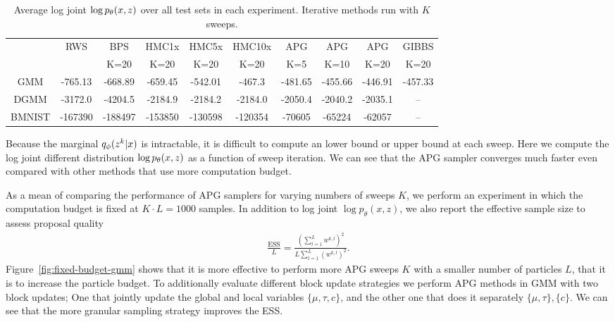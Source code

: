 \documentclass{article}
\theoremstyle{definition}
\begin{document}
\begin{table}[t!]
\centering
\caption{Average log joint $\log p_\theta (x, z)$ over all test sets in each experiment. Iterative methods run with $K$ sweeps. }
\begin{tabular}{cccccccccc}
\toprule
     & RWS & BPS & HMC1x & HMC5x & HMC10x & APG & APG & APG & GIBBS \\
     & & K=20 & K=20 & K=20 & K=20 &  K=5 & K=10 & K=20 & K=20 \\
    \midrule
    GMM & -765.13 & -668.89 & -659.45 & -542.01 & -467.3 & -481.65 & -455.66 & -446.91 & -457.33 \\
    DGMM & -3172.0 & -4204.5 & -2184.9 & -2184.2 & -2184.0 & -2050.4 & -2040.2 & -2035.1 & -- \\
    BMNIST & -167390 & -188497 & -153850 & -130598 & -120354 & -70605 & -65224 & -62057 & --\\
    \bottomrule
\end{tabular}
\end{table}
Because the marginal $q_\phi(z^k | x)$ is intractable, it is difficult to compute an lower bound or upper bound at each sweep. Here we compute the log joint different distribution $\log p_\theta(x, z)$ as a function of sweep iteration. We can see that the APG sampler converges much faster even compared with other methods that use more computation budget.

As a mean of comparing the performance of APG samplers for varying numbers of sweeps $K$, we perform an experiment in which the computation budget is fixed at $K \cdot L = 1000$ samples. In addition to log joint $\log p_\theta(x, z)$, we also report the effective sample size to assess proposal quality 
\begin{align*}
    \frac{\text{ESS}}{L} 
    = 
    \frac{(\sum_{l=1}^L w^{k,l})^2}
         {L \sum_{l=1}^L (w^{k,l})^2}
    .
\end{align*}
Figure~\ref{fig:fixed-budget-gmm} shows that it is more effective to perform more APG sweeps $K$ with a smaller number of particles $L$, that it is to increase the particle budget. To additionally evaluate different block update strategies we perform APG methods in GMM with two block updates; One that jointly update the global and local variables $\{\mu, \tau, c\}$, and the other one that does it separately $\{\mu, \tau\}, \{c\}$. We can see that the more granular sampling strategy improves the ESS.
\end{document}
